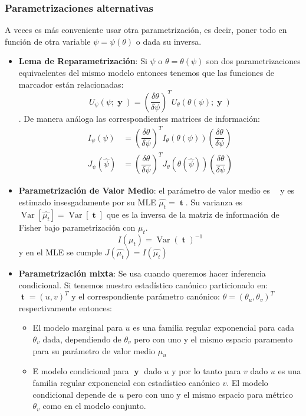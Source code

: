 \documentclass[pdftex,11pt,a4paper]{article}
\DeclareMathOperator{\muestra}{\mathbf{y}}
\DeclareMathOperator{\est}{\mathbf{t}}
\DeclareMathOperator{\Var}{Var}
\DeclareMathOperator*{\valmed}{\mu_t(\theta)}
\begin{document}
\subsubsection{Parametrizaciones alternativas}
A veces es más conveniente usar otra parametrización, es decir, poner todo en función de otra variable $\psi = \psi(\theta)$ o dada su inversa. 
\begin{itemize}
	\item \textbf{Lema de Reparametrización}: Si $\psi$ o $\theta = \theta(\psi)$ son dos parametrizaciones equivaelentes del mismo modelo entonces tenemos que las funciones de marcador están relacionadas: $$U_\psi(\psi;\muestra) = \left(\dfrac{\delta \theta}{ \delta \psi}\right)^T U_\theta(\theta(\psi);\muestra)$$.
	De manera análoga las correspondientes matrices de información:
	\begin{align*}
	I_\psi(\psi) &= \left(\dfrac{\delta \theta}{ \delta \psi}\right)^T I_\theta(\theta(\psi))\left(\dfrac{\delta \theta}{ \delta \psi}\right)\\
		J_\psi(\hat{\psi})& = \left(\dfrac{\delta \theta}{ \delta \psi}\right)^T J_\theta(\theta(\hat{\psi}))\left(\dfrac{\delta \theta}{ \delta \psi}\right)
	\end{align*}
	\item \textbf{Parametrización de Valor Medio}: el parámetro de valor medio es $\valmed$ y es estimado insesgadamente por su MLE $\hat{\mu_t} = \est$. Su varianza es $\Var[\hat{\mu_t}] = \Var[\est]$ que es la inversa de la matriz de información de Fisher bajo parametrización con $\mu_t$. $$I(\mu_t) = \Var(\est)^{-1}$$ y en el MLE se cumple $J(\hat{\mu_t}) = I(\hat{\mu_t})$
	\item \textbf{Parametrización mixta}: Se usa cuando queremos hacer inferencia condicional. Si tenemos nuestro estadístico canónico particionado en: $\est = (u,v)^T$ y el correspondiente parámetro canónico: $\theta = (\theta_u, \theta_v) ^T$ respectivamente entonces:
	\begin{itemize}
		\item El modelo marginal para $u$ es una familia regular exponencial para cada $\theta_v$ dada, dependiendo de $\theta_v$ pero con uno y el mismo espacio paramento para su parámetro de valor medio $\mu_u$
		\item E modelo condicional para $\muestra$ dado $u$ y por lo tanto para $v$ dado $u$ es una familia regular exponencial con estadístico canónico $v$. El modelo condicional depende de $u$ pero con uno y el mismo espacio para métrico $\theta_v$ como en el modelo conjunto.

\end{itemize}
\end{itemize}
\end{document}
